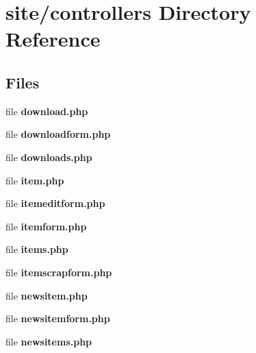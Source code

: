 \section{site/controllers Directory Reference}
\label{dir_3a27be132acf31dad96be5a05bd3bfa5}
\subsection*{Files}
\begin{DoxyCompactItemize}
\item 
file \textbf{ download.\+php}
\item 
file \textbf{ downloadform.\+php}
\item 
file \textbf{ downloads.\+php}
\item 
file \textbf{ item.\+php}
\item 
file \textbf{ itemeditform.\+php}
\item 
file \textbf{ itemform.\+php}
\item 
file \textbf{ items.\+php}
\item 
file \textbf{ itemscrapform.\+php}
\item 
file \textbf{ newsitem.\+php}
\item 
file \textbf{ newsitemform.\+php}
\item 
file \textbf{ newsitems.\+php}
\end{DoxyCompactItemize}

